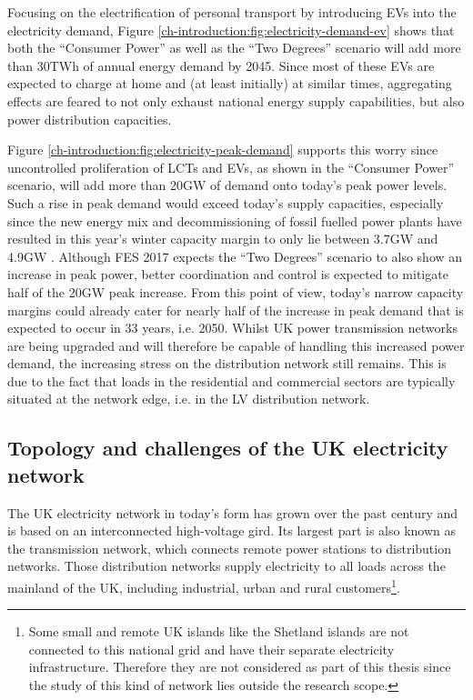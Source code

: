 

Focusing on the electrification of personal transport by introducing EVs into the electricity demand, Figure \ref{ch-introduction:fig:electricity-demand-ev} shows that both the ``Consumer Power'' as well as the ``Two Degrees'' scenario will add more than 30TWh of annual energy demand by 2045.
Since most of these EVs are expected to charge at home and (at least initially) at similar times, aggregating effects are feared to not only exhaust national energy supply capabilities, but also power distribution capacities.




Figure \ref{ch-introduction:fig:electricity-peak-demand} supports this worry since uncontrolled proliferation of LCTs and EVs, as shown in the ``Consumer Power'' scenario, will add more than 20GW of demand onto today's peak power levels.
Such a rise in peak demand would exceed today's supply capacities, especially since the new energy mix and decommissioning of fossil fuelled power plants have resulted in this year's winter capacity margin to only lie between 3.7GW and 4.9GW \cite{NationalGrid2017a}.
Although FES 2017 expects the ``Two Degrees'' scenario to also show an increase in peak power, better coordination and control is expected to mitigate half of the 20GW peak increase.
From this point of view, today's narrow capacity margins could already cater for nearly half of the increase in peak demand that is expected to occur in 33 years, i.e. 2050.
Whilst UK power transmission networks are being upgraded and will therefore be capable of handling this increased power demand, the increasing stress on the distribution network still remains.
This is due to the fact that loads in the residential and commercial sectors are typically situated at the network edge, i.e. in the LV distribution network.

\subsection{Topology and challenges of the UK electricity network}
\label{ch-introduction:subsec:topology-of-lv-network}

The UK electricity network in today's form has grown over the past century and is based on an interconnected high-voltage gird.
Its largest part is also known as the transmission network, which connects remote power stations to distribution networks.
Those distribution networks supply electricity to all loads across the mainland of the UK, including industrial, urban and rural customers\footnote{Some small and remote UK islands like the Shetland islands are not connected to this national grid and have their separate electricity infrastructure. Therefore they are not considered as part of this thesis since the study of this kind of network lies outside the research scope.}.

